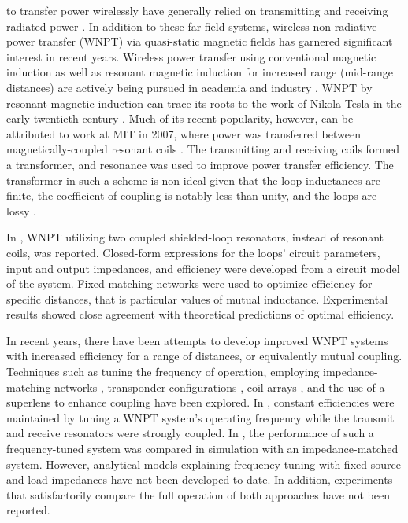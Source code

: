 \documentclass[journal]{IEEEtran}
\begin{document}
\setcounter{equation}{5}

\begin{figure*}[b!]
\normalsize
\hrulefill


\vspace*{4pt}
\end{figure*}

\setcounter{equation}{\value{tempequationcounter}}

 to transfer power wirelessly have generally relied on transmitting and receiving radiated power \cite{PowerHistory, LowPowerFarField}. In addition to these far-field systems, wireless non-radiative power transfer (WNPT) via quasi-static magnetic fields has garnered significant interest in recent years. Wireless power transfer using conventional magnetic induction as well as resonant magnetic induction for increased range (mid-range distances) are actively being pursued in academia and industry \cite{eCoupled, WPC, A4WP, PMA, InductivePowerTransfer, Coil4ConsumerElec}. WNPT by resonant magnetic induction can trace its roots to the work of Nikola Tesla in the early twentieth century \cite{Tesla-Patent1,Tesla-Patent2,SecorArticle}. Much of its recent popularity, however, can be attributed to work at MIT in 2007, where power was transferred between magnetically-coupled resonant coils \cite{Soljacic}.  The transmitting and receiving coils formed a transformer, and resonance was used to improve power transfer efficiency.  The transformer in such a scheme is non-ideal given that the loop inductances are finite, the coefficient of coupling is notably less than unity, and the loops are lossy \cite{Everitt}.

In \cite{Thomas, Thomas2}, WNPT utilizing two coupled shielded-loop resonators, instead of resonant coils, was reported. Closed-form expressions for the loops' circuit parameters, input and output impedances, and efficiency were developed from a circuit model of the system. Fixed matching networks were used to optimize efficiency for specific distances, that is particular values of mutual inductance. Experimental results showed close agreement with theoretical predictions of optimal efficiency.

In recent years, there have been attempts to develop improved WNPT systems with increased efficiency for a range of distances, or equivalently mutual coupling. Techniques such as tuning the frequency of operation, employing impedance-matching networks \cite{MatchingNet1, MatchingNet2, Multireceive}, transponder configurations \cite{Mauro, CritReview}, coil arrays \cite{PhasedArray}, and the use of a superlens to enhance coupling \cite{Superlens} have been explored. In \cite{Intel,Korea,VehicalPower}, constant efficiencies were maintained by tuning a WNPT system's operating frequency while the transmit and receive resonators were strongly coupled. In \cite{FreqTune-Exp}, the performance of such a frequency-tuned system was compared in simulation with an impedance-matched system. However, analytical models explaining frequency-tuning with fixed source and load impedances have not been developed to date. In addition, experiments that satisfactorily compare the full operation of both approaches have not been reported.
\end{document}
